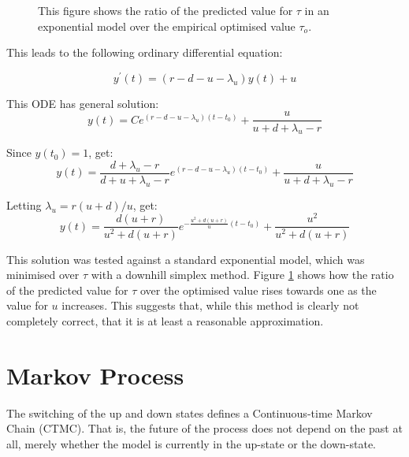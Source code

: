 \begin{figure}[b!]
\begin{center}
\resizebox{0.75\textwidth}{!}{}
\caption{\label{predovertauopt} This figure shows the ratio of the predicted value for $\tau$ in an exponential model over the empirical optimised value $\tau_o$.}
\end{center}
\end{figure}

This leads to the following ordinary differential equation:

\begin{equation}
y^\prime(t) = \left( r - d - u - \lambda_u \right)y(t) + u
\end{equation}

This ODE has general solution:
\begin{equation}
y(t) = Ce^{(r-d-u-\lambda_u)(t-t_0)} + \frac{u}{u+d+\lambda_u - r}
\end{equation}

Since $y(t_0) = 1$, get:
\begin{equation}
y(t) = \frac{d+\lambda_u - r}{d+u+\lambda_u -r} e^{(r-d-u-\lambda_u)(t-t_0)} + \frac{u}{u+d+\lambda_u-r}
\end{equation}

Letting $\lambda_u = r(u+d)/u$, get:
\begin{equation}
y(t) = \frac{d(u+r)}{u^2 + d(u+r)} e^{-\frac{u^2+d(u+r)}{u}(t-t_0)} + \frac{u^2}{u^2+ d(u+r)}
\end{equation}

This solution was tested against a standard exponential model, which was minimised over $\tau$ with a downhill simplex method.  Figure \ref{predovertauopt} shows how the ratio of the predicted value for $\tau$ over the optimised value rises towards one as the value for $u$ increases.  This suggests that, while this method is clearly not completely correct, that it is at least a reasonable approximation.

\section{Markov Process}

The switching of the up and down states defines a Continuous-time Markov Chain (CTMC).  That is, the future of the process does not depend on the past at all, merely whether the model is currently in the up-state or the down-state.


